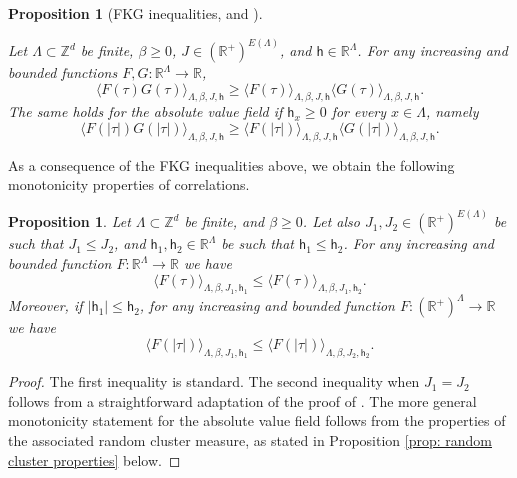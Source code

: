 \documentclass[11pt,a4paper]{article}
\numberwithin{equation}{section}
\theoremstyle{plain}
\newtheorem{Prop}[Thm]{Proposition}
\theoremstyle{definition}
\begin{document}
\begin{Prop}[FKG inequalities, {\cite[Propositions~B.1--B.2]{GunaratnamPanagiotisPanisSeveroPhi42022} and \cite[Corollary~6.4]{LammersOtt2021}}] \label{prop: FKG phi4}

Let $\Lambda \subset \mathbb Z^d$ be finite, $\beta\geq0$, $J\in (\mathbb R^+)^{E(\Lambda)}$, and $\mathsf{h}\in \mathbb R^\Lambda$. For any increasing and bounded functions $F,G:\mathbb{R}^\Lambda\to \mathbb{R}$,
\begin{equation}
    \langle F(\tau)G(\tau)\rangle_{\Lambda,\beta,J, \mathsf{h}}\geq \langle F(\tau)\rangle_{\Lambda,\beta,J, \mathsf{h}}\langle G(\tau)\rangle_{\Lambda,\beta,J,\mathsf{h}}.
\end{equation}
The same holds for the absolute value field if $\mathsf h_x \geq 0$ for every $x \in \Lambda$, namely
\begin{equation}
    \langle F(|\tau|)G(|\tau|) \rangle_{\Lambda,\beta,J,\mathsf{h}}\geq \langle F(|\tau|) \rangle_{\Lambda,\beta,J,\mathsf{h}} \langle G(|\tau|) \rangle_{\Lambda,\beta,J,\mathsf{h}}.
\end{equation}
\end{Prop}

As a consequence of the FKG inequalities above, we obtain the following monotonicity properties of correlations.

\begin{Prop}\label{prop:stoc_monotonicity}
Let $\Lambda \subset \mathbb Z^d$ be finite, and $\beta\geq0$. Let also $J_1,J_2\in (\mathbb R^+)^{E(\Lambda)}$ be such that $J_1\leq J_2$, and $\mathsf{h}_1,\mathsf{h}_2\in \mathbb R^\Lambda$ be such that $\mathsf{h}_1\leq \mathsf{h}_2$. For any increasing and bounded function $F:\mathbb{R}^{\Lambda}\to\mathbb{R}$ we have 
\begin{equation}
\langle F(\tau) \rangle_{\Lambda,\beta,J_1,\mathsf{h}_1}\leq \langle F(\tau) \rangle_{\Lambda,\beta,J_1,\mathsf{h}_2}.  
\end{equation}
Moreover, if $|\mathsf{h}_1| \leq \mathsf{h}_2$, for any increasing and bounded function $F: (\mathbb{R}^+)^{\Lambda}\to\mathbb{R}$ we have 
\begin{equation}
\langle F(|\tau|) \rangle_{\Lambda,\beta,J_1,\mathsf{h}_1}\leq \langle F(|\tau|) \rangle_{\Lambda,\beta,J_2,\mathsf{h}_2}.  
\end{equation}
\end{Prop}
\begin{proof} The first inequality is standard. The second inequality when $J_1=J_2$ follows from a straightforward adaptation of the proof of \cite[Lemma 2.13]{GunaratnamPanagiotisPanisSeveroPhi42022}. The more general monotonicity statement for the absolute value field follows from the properties of the associated random cluster measure, as stated in Proposition \ref{prop: random cluster properties} below.
\end{proof}
\end{document}
